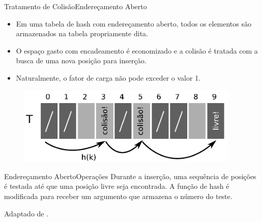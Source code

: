 \documentclass[aspectratio=169]{beamer}
\begin{document}

\begin{frame}{Tratamento de Colisão}{Endereçamento Aberto}
\begin{itemize}
 \item Em uma tabela de hash com endereçamento aberto, todos os elementos são armazenados na tabela propriamente dita. 
 \item O espaço gasto com encadeamento é economizado e a colisão é tratada com a busca de uma nova posição para inserção.
 \item Naturalmente, o fator de carga não pode exceder o valor 1.
\end{itemize}
\begin{figure}[!h]
  \centering
  \includegraphics[width=300pt]{imagens/enderecamento_aberto.png}
  \label{fig_enderecamento_aberto}
\end{figure}
\end{frame}


\begin{frame}{Endereçamento Aberto}{Operações}
Durante a inserção, uma sequência de posições é testada até que uma posição livre seja encontrada. A função de hash é modificada para receber um argumento que armazena o número do teste.

\tiny{Adaptado de .}
\end{frame}
\end{document}
